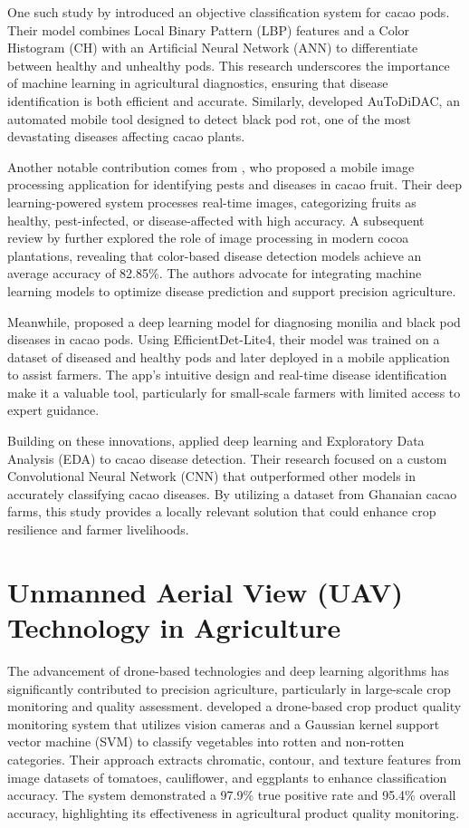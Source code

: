 One such study by \cite{BaculioBarbosa2022} introduced an objective classification system for cacao pods. Their model combines Local Binary Pattern (LBP) features and a Color Histogram (CH) with an Artificial Neural Network (ANN) to differentiate between healthy and unhealthy pods. This research underscores the importance of machine learning in agricultural diagnostics, ensuring that disease identification is both efficient and accurate. Similarly, \cite{Tan2018} developed AuToDiDAC, an automated mobile tool designed to detect black pod rot, one of the most devastating diseases affecting cacao plants.

Another notable contribution comes from \cite{Basri2020}, who proposed a mobile image processing application for identifying pests and diseases in cacao fruit. Their deep learning-powered system processes real-time images, categorizing fruits as healthy, pest-infected, or disease-affected with high accuracy. A subsequent review by \cite{Basri2020} further explored the role of image processing in modern cocoa plantations, revealing that color-based disease detection models achieve an average accuracy of 82.85\%. The authors advocate for integrating machine learning models to optimize disease prediction and support precision agriculture.

Meanwhile, \cite{Buenano2024} proposed a deep learning model for diagnosing monilia and black pod diseases in cacao pods. Using EfficientDet-Lite4, their model was trained on a dataset of diseased and healthy pods and later deployed in a mobile application to assist farmers. The app's intuitive design and real-time disease identification make it a valuable tool, particularly for small-scale farmers with limited access to expert guidance.

Building on these innovations, \cite{Tovurawa2025} applied deep learning and Exploratory Data Analysis (EDA) to cacao disease detection. Their research focused on a custom Convolutional Neural Network (CNN) that outperformed other models in accurately classifying cacao diseases. By utilizing a dataset from Ghanaian cacao farms, this study provides a locally relevant solution that could enhance crop resilience and farmer livelihoods.

\section{Unmanned Aerial View (UAV) Technology in Agriculture}
The advancement of drone-based technologies and deep learning algorithms has significantly contributed to precision agriculture, particularly in large-scale crop monitoring and quality assessment. \cite{Alam2022} developed a drone-based crop product quality monitoring system that utilizes vision cameras and a Gaussian kernel support vector machine (SVM) to classify vegetables into rotten and non-rotten categories. Their approach extracts chromatic, contour, and texture features from image datasets of tomatoes, cauliflower, and eggplants to enhance classification accuracy. The system demonstrated a 97.9\% true positive rate and 95.4\% overall accuracy, highlighting its effectiveness in agricultural product quality monitoring.

